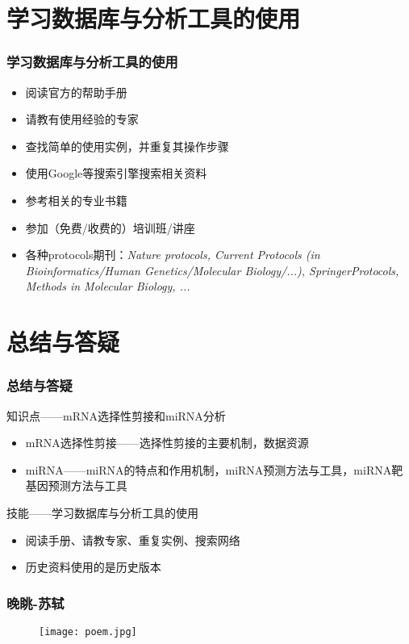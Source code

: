 \section{学习数据库与分析工具的使用}
\begin{frame}
  \frametitle{学习数据库与分析工具的使用}
  \begin{itemize}
    \item 阅读官方的帮助手册
    \item 请教有使用经验的专家
    \item 查找简单的使用实例，并重复其操作步骤
    \item 使用Google等搜索引擎搜索相关资料
    \item 参考相关的专业书籍
    \item 参加（免费/收费的）培训班/讲座
    \item 各种protocols期刊：\textit{Nature protocols, Current Protocols (in Bioinformatics/Human Genetics/Molecular Biology/...), SpringerProtocols, Methods in Molecular Biology, ...}
  \end{itemize}
\end{frame}

\section{总结与答疑}
\begin{frame}
  \frametitle{总结与答疑}
  \begin{block}{知识点——mRNA选择性剪接和miRNA分析}
    \begin{itemize}
      \item mRNA选择性剪接——选择性剪接的主要机制，数据资源
      \item miRNA——miRNA的特点和作用机制，miRNA预测方法与工具，miRNA靶基因预测方法与工具
    \end{itemize}
  \end{block}
  \begin{block}{技能——学习数据库与分析工具的使用}
    \begin{itemize}
      \item 阅读手册、请教专家、重复实例、搜索网络
      \item 历史资料使用的是历史版本
    \end{itemize}
  \end{block}
\end{frame}

\begin{frame}
  \frametitle{晚眺-苏轼}
  \begin{figure}
    \centering
    \texttt{[image: poem.jpg]}
  \end{figure}
\end{frame}


